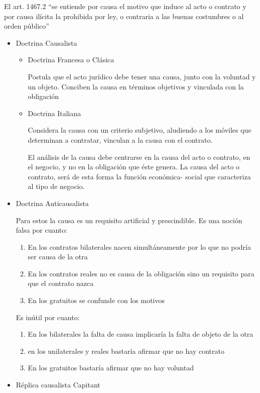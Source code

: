 \documentclass[]{article}
\providecommand{\tightlist}{%
  \setlength{\itemsep}{0pt}\setlength{\parskip}{0pt}}
\begin{document}
\begin{itemize}
  El art. 1467.2 ``se entiende por causa el motivo que induce al acto o
  contrato y por causa ilícita la prohibida por ley, o contraria a las
  buenas costumbres o al orden público''

  \begin{itemize}
  \item
    Doctrina Causalista

    \begin{itemize}
    \item
      Doctrina Francesa o Clásica

      Postula que el acto jurídico debe tener una causa, junto con la
      voluntad y un objeto. Conciben la causa en términos objetivos y
      vinculada con la obligación
    \item
      Doctrina Italiana

      Considera la causa con un criterio subjetivo, aludiendo a los
      móviles que determinan a contratar, vinculan a la causa con el
      contrato.

      El análisis de la causa debe centrarse en la causa del acto o
      contrato, en el negocio, y no en la obligación que éste genera. La
      causa del acto o contrato, será de esta forma la función
      económica- social que caracteriza al tipo de negocio.
    \end{itemize}
  \item
    Doctrina Anticausalista

    Para estos la causa es un requisito artificial y prescindible. Es
    una noción falsa por cuanto:

    \begin{enumerate}
    \def\labelenumi{\arabic{enumi}.}
    \tightlist
    \item
      En los contratos bilaterales nacen simultáneamente por lo que no
      podría ser causa de la otra
    \item
      En los contratos reales no es causa de la obligación sino un
      requisito para que el contrato nazca
    \item
      En los gratuitos se confunde con los motivos
    \end{enumerate}

    Es inútil por cuanto:

    \begin{enumerate}
    \def\labelenumi{\arabic{enumi}.}
    \tightlist
    \item
      En los bilaterales la falta de causa implicaría la falta de objeto
      de la otra
    \item
      en los unilaterales y reales bastaría afirmar que no hay contrato
    \item
      En los gratuitos bastaría afirmar que no hay voluntad
    \end{enumerate}
  \item
    Réplica causalista Capitant


\end{itemize}
\end{itemize}
\end{document}
